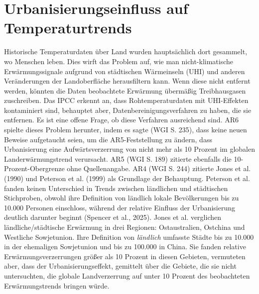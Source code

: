 \documentclass[12pt,paper=a4,DIV=12,parskip=never,chapterprefix=false,headings=standardclasses]{scrreprt}
\begin{document}
\section{Urbanisierungseinfluss auf Temperaturtrends}
Historische Temperaturdaten über Land wurden hauptsächlich dort gesammelt, wo Menschen leben. Dies wirft das Problem auf, wie man nicht-klimatische Erwärmungssignale aufgrund von städtischen Wärmeinseln (UHI) und anderen Veränderungen der Landoberfläche herausfiltern kann. Wenn diese nicht entfernt werden, könnten die Daten beobachtete Erwärmung übermäßig Treibhausgasen zuschreiben. Das IPCC erkennt an, dass Rohtemperaturdaten mit UHI-Effekten kontaminiert sind, behauptet aber, Datenbereinigungsverfahren zu haben, die sie entfernen. Es ist eine offene Frage, ob diese Verfahren ausreichend sind.
AR6 spielte dieses Problem herunter, indem es sagte (WGI S. 235), dass keine neuen Beweise aufgetaucht seien, um die AR5-Feststellung zu ändern, dass Urbanisierung eine Aufwärtsverzerrung von nicht mehr als 10 Prozent im globalen Landerwärmungstrend verursacht. AR5 (WGI S. 189) zitierte ebenfalls die 10-Prozent-Obergrenze ohne Quellenangabe. AR4 (WGI S. 244) zitierte Jones et al. (1990) und Peterson et al. (1999) als Grundlage der Behauptung. Peterson et al. fanden keinen Unterschied in Trends zwischen ländlichen und städtischen Stichproben, obwohl ihre Definition von ländlich lokale Bevölkerungen bis zu 10.000 Personen einschloss, während der relative Einfluss der Urbanisierung deutlich darunter beginnt (Spencer et al., 2025). Jones et al. verglichen ländliche/städtische Erwärmung in drei Regionen: Ostaustralien, Ostchina und Westliche Sowjetunion. Ihre Definition von \emph{ländlich} umfasste Städte bis zu 10.000 in der ehemaligen Sowjetunion und bis zu 100.000 in China. Sie fanden relative Erwärmungsverzerrungen größer als 10 Prozent in diesen Gebieten, vermuteten aber, dass der Urbanisierungseffekt, gemittelt über die Gebiete, die sie nicht untersuchten, die globale Landverzerrung auf unter 10 Prozent des beobachteten Erwärmungstrends bringen würde.
\end{document}
